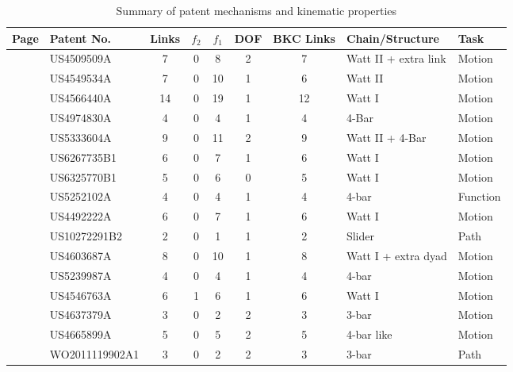 \documentclass[11pt]{article}
\begin{document}
\begin{table}[H]
  \centering
  \small
  \caption{Summary of patent mechanisms and kinematic properties}
  \begin{tabular}{|l|l|c|c|c|c|c|l|l|}
    \hline
    Page & Patent No. & Links & $f_2$ & $f_1$ & DOF & BKC Links & Chain/Structure & Task \\
    \hline
    \pageref{fig:US4509509A} & US4509509A & 7 & 0 & 8 & 2 & 7 & Watt II + extra link & Motion \\
    \hline
    \pageref{fig:US4549534A} & US4549534A & 7 & 0 & 10 & 1 & 6 & Watt II & Motion \\
    \hline
    \pageref{fig:US4566440A} & US4566440A & 14 & 0 & 19 & 1 & 12 & Watt I & Motion \\
    \hline
    \pageref{fig:US4974830A} & US4974830A & 4 & 0 & 4 & 1 & 4 & 4-Bar & Motion \\
    \hline
    \pageref{fig:US5333604A} & US5333604A & 9 & 0 & 11 & 2 & 9 & Watt II + 4-Bar & Motion \\
    \hline
    \pageref{fig:US6267735B1} & US6267735B1 & 6 & 0 & 7 & 1 & 6 & Watt I & Motion \\
    \hline
    \pageref{fig:US6325770B1} & US6325770B1 & 5 & 0 & 6 & 0 & 5 & Watt I & Motion \\
    \hline
    \pageref{fig:US5252102A} & US5252102A & 4 & 0 & 4 & 1 & 4 & 4-bar & Function \\
    \hline
    \pageref{fig:US4492222A} & US4492222A & 6 & 0 & 7 & 1 & 6 & Watt I & Motion \\
    \hline
    \pageref{fig:US10272291B2} & US10272291B2 & 2 & 0 & 1 & 1 & 2 & Slider & Path \\
    \hline
    \pageref{fig:US4603687A} & US4603687A & 8 & 0 & 10 & 1 & 8 & Watt I + extra dyad & Motion \\
    \hline
    \pageref{fig:US5239987A} & US5239987A & 4 & 0 & 4 & 1 & 4 & 4-bar & Motion \\
    \hline
    \pageref{fig:US4546763A} & US4546763A & 6 & 1 & 6 & 1 & 6 & Watt I & Motion \\
    \hline
    \pageref{fig:US4637379A} & US4637379A & 3 & 0 & 2 & 2 & 3 & 3-bar & Motion \\
    \hline
    \pageref{fig:US4665899A} & US4665899A & 5 & 0 & 5 & 2 & 5 & 4-bar like & Motion \\
    \hline
    \pageref{fig:WO2011119902A1} & WO2011119902A1 & 3 & 0 & 2 & 2 & 3 & 3-bar & Path \\
    \hline
  \end{tabular}
\end{table}
\end{document}
